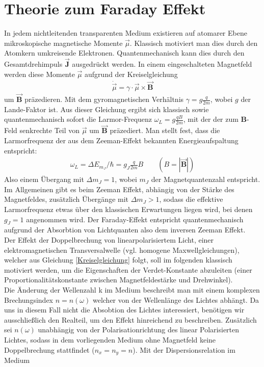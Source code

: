 \documentclass[12pt,a4paper]{article}
\begin{document}
 \section{Theorie zum Faraday Effekt}
In jedem nichtleitenden transparenten Medium existieren auf atomarer Ebene mikroskopische magnetische Momente $\vec{\mu}$. Klassisch motiviert man dies durch den Atomkern umkreisende Elektronen. Quantenmechanisch kann dies durch den Gesamtdrehimpuls $\vec{\textbf{J}}$ ausgedrückt werden. In einem eingeschalteten Magnetfeld werden diese Momente $\vec{\mu}$ aufgrund der Kreiselgleichung
\begin{align}
\dot{\vec{\mu}} = \gamma\cdot\vec{\mu}\times\vec{\textbf{B}}
\label{Kreiselgleichung}
\end{align}
um $\vec{\textbf{B}}$ präzedieren. Mit dem gyromagnetischen Verhältnis $\gamma = g\frac{q}{2m}$, wobei $g$ der Lande-Faktor ist.
Aus dieser Gleichung ergibt sich klassisch sowie quantenmechanisch sofort die Larmor-Frequenz $\omega_L = g\frac{q B}{2m}$, mit der der zum \textbf{B}-Feld senkrechte Teil von $\vec{\mu}$ um $\vec{\textbf{B}}$ präzediert. Man stellt fest, dass die Larmorfrequenz der aus dem Zeeman-Effekt bekannten Energieaufspaltung entspricht: 
\begin{align}
\omega_L = \Delta E_{m_J}/ \hbar = g_J\frac{q}{2m}B \qquad (B = |\vec{\textbf{B}}|)
\label{Larmorfrequenz}
\end{align}
Also einem Übergang mit $\Delta m_J = 1$, wobei $m_J$ der Magnetquantenzahl entspricht.\\
Im Allgemeinen gibt es beim Zeeman Effekt, abhängig von der Stärke des Magnetfeldes, zusätzlich Übergänge mit $\Delta m_J > 1$, sodass die effektive Larmorfrequenz etwas über den klassischen Erwartungen liegen wird, bei denen $g_J=1$ angenommen wird. Der Faraday-Effekt entspricht quantenmechanisch aufgrund der Absorbtion von Lichtquanten also dem inversen Zeeman Effekt.\\
Der Effekt der Doppelbrechung von linearpolarisiertem Licht, einer elektromagnetischen Transversalwelle (vgl. homogene Maxwellgleichungen), welcher aus Gleichung \ref{Kreiselgleichung} folgt, soll im folgenden klassisch motiviert werden, um die Eigenschaften der Verdet-Konstante abzuleiten (einer Proportionalitätskonstante zwischen Magnetfeldestärke und Drehwinkel).\\
Die Änderung der Wellenzahl k im Medium beschreibt man mit einem komplexen Brechungsindex $n = n(\omega)$ welcher von der Wellenlänge des Lichtes abhängt. Da uns in diesem Fall nicht die Absobtion des Lichtes interessiert, benötigen wir ausschließlich den Realteil, um den Effekt hinreichend zu beschreiben. Zusätzlich sei $n(\omega)$ unabhängig von der Polarisationrichtung des linear Polarisierten Lichtes, sodass in dem vorliegenden Medium ohne Magnetfeld keine Doppelbrechung stattfindet ($n_x = n_y = n$). Mit der Dispersionsrelation im Medium
\end{document}
